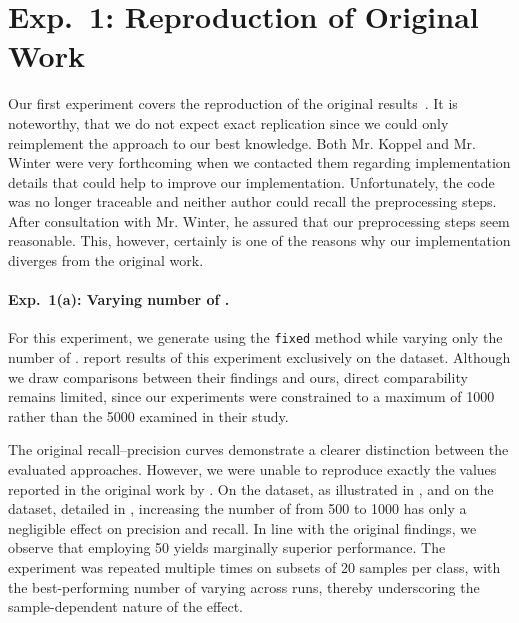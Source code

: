 
\section{Exp.\ 1: Reproduction of Original Work}

Our first experiment covers the reproduction of the original results~\citep{koppel_determining_2014}.
It is noteworthy, that we do not expect exact replication since we could only reimplement the approach to our best knowledge.
Both Mr. Koppel and Mr. Winter were very forthcoming when we contacted them regarding implementation details that could help to improve our implementation.
Unfortunately, the code was no longer traceable and neither author could recall the preprocessing steps.
After consultation with Mr. Winter, he assured that our preprocessing steps seem reasonable.
This, however, certainly is one of the reasons why our implementation diverges from the original work.

\paragraph{Exp.\ 1(a): Varying number of \imps{}.}

For this experiment, we generate \imps{} using the \texttt{fixed} method while varying only the number of \imps{}.
\citet{koppel_determining_2014} report results of this experiment exclusively on the \dataBlog{} dataset.
Although we draw comparisons between their findings and ours, direct comparability remains limited, since our experiments were constrained to a maximum of \num{1000} \imps{} rather than the \num{5000} examined in their study.

The original \impAppr{} recall–precision curves demonstrate a clearer distinction between the evaluated approaches.
However, we were unable to reproduce exactly the values reported in the original work by \citet{koppel_determining_2014}.
On the \dataBlog{} dataset, as illustrated in , and on the \dataStudent{} dataset, detailed in , increasing the number of \imps{} from 500 to \num{1000} has only a negligible effect on precision and recall.
In line with the original findings, we observe that employing 50 \imps{} yields marginally superior performance.
The experiment was repeated multiple times on subsets of 20 samples per class, with the best-performing number of \imps{} varying across runs, thereby underscoring the sample-dependent nature of the effect.




